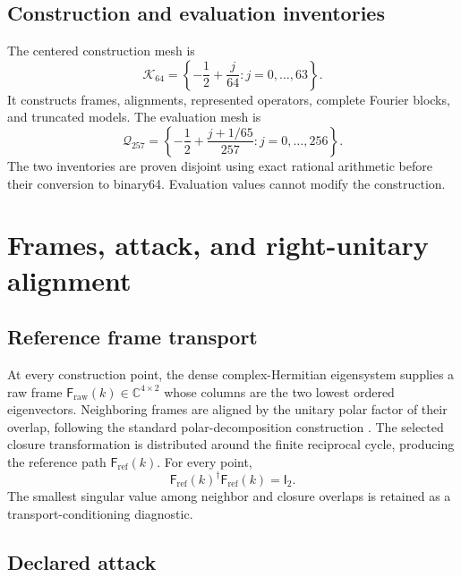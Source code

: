 \documentclass[11pt]{article}
\newcommand{\CC}{\mathbb{C}}
\newcommand{\mat}[1]{\mathsf{#1}}
\begin{document}
\subsection{Construction and evaluation inventories}

The centered construction mesh is
\begin{equation}
 \mathcal K_{64}=\left\{-\frac12+\frac{j}{64}:j=0,\ldots,63\right\}.
 \label{eq:construction-mesh}
\end{equation}
It constructs frames, alignments, represented operators, complete Fourier blocks, and
truncated models.  The evaluation mesh is
\begin{equation}
 \mathcal Q_{257}=\left\{-\frac12+
 \frac{j+1/65}{257}:j=0,\ldots,256\right\}.
 \label{eq:evaluation-mesh}
\end{equation}
The two inventories are proven disjoint using exact rational arithmetic before their
conversion to binary64.  Evaluation values cannot modify the construction.

\section{Frames, attack, and right-unitary alignment}

\subsection{Reference frame transport}

At every construction point, the dense complex-Hermitian eigensystem supplies a raw
frame $\mat{F}_{\mathrm{raw}}(k)\in\CC^{4\times2}$ whose columns are the two lowest
ordered eigenvectors.  Neighboring frames are aligned by the unitary polar factor of
their overlap, following the standard polar-decomposition construction
\cite{higham1986}.  The selected closure transformation is distributed around the
finite reciprocal cycle, producing the reference path $\mat{F}_{\mathrm{ref}}(k)$.
For every point,
\begin{equation}
 \mat{F}_{\mathrm{ref}}(k)^{\dagger}\mat{F}_{\mathrm{ref}}(k)=\mat{I}_2.
\end{equation}
The smallest singular value among neighbor and closure overlaps is retained as a
transport-conditioning diagnostic.

\subsection{Declared attack}
\end{document}
